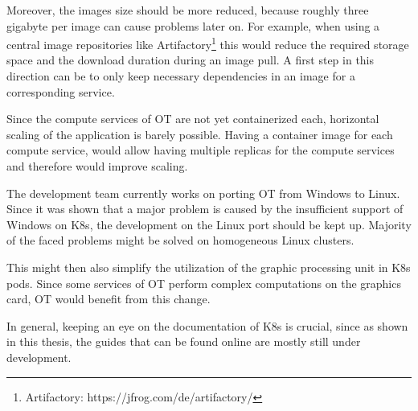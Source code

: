 Moreover, the images size should be more reduced, because roughly three gigabyte per image can cause problems later on. For example, when using a central image repositories like Artifactory\footnote{Artifactory: https://jfrog.com/de/artifactory/} this would reduce the required storage space and the download duration during an image pull. A first step in this direction can be to only keep necessary dependencies in an image for a corresponding service.

Since the compute services of \ac{OT} are not yet containerized each, horizontal scaling of the application is barely possible. Having a container image for each compute service, would allow having multiple replicas for the compute services and therefore would improve scaling.

The development team currently works on porting \ac{OT} from \ac{Windows} to Linux.
Since it was shown that a major problem is caused by the insufficient support of \ac{Windows} on \ac{K8s}, the development on the Linux port should be kept up. Majority of the faced problems might be solved on homogeneous Linux clusters.

This might then also simplify the utilization of the graphic processing unit in \ac{K8s} pods. Since some services of \ac{OT} perform complex computations on the graphics card, \ac{OT} would benefit from this change.

In general, keeping an eye on the documentation of \ac{K8s} is crucial, since as shown in this thesis, the guides that can be found online are mostly still under development.






